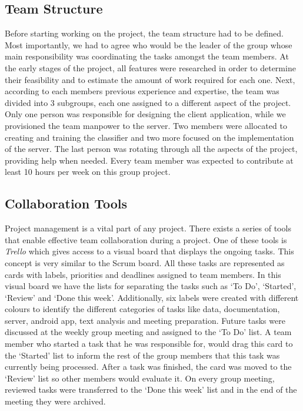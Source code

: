 \subsection{Team Structure} 
Before starting working on the project, the team structure had to be defined. Most importantly, we had to 
agree who would be the leader of the group whose main responsibility was coordinating the tasks amongst the 
team members. At the early stages of the project, all features were researched in order to 
determine their feasibility and to estimate the amount of work required for each one. Next, according to 
each members previous experience and expertise, the team was divided into 3 subgroups, each one assigned to 
a different aspect of the project. Only one person was responsible for designing the client application, while
we provisioned the team manpower to the server. Two members were allocated to creating and training 
the classifier and two more focused on the implementation of the server. The last person was rotating through 
all the aspects of the project, providing help when needed. Every team member was expected to contribute 
at least 10 hours per week on this group project.

\subsection{Collaboration Tools} 
Project management is a vital part of any project. There exists a series of tools that enable effective team 
collaboration during a project. One of these tools is \emph{Trello} which gives access to a visual board 
that displays the ongoing tasks. This concept is very similar to the Scrum board. All these tasks 
are represented as cards with labels, priorities and deadlines assigned to 
team members. In this visual board we have the lists for separating the tasks such as `To Do', `Started', `Review' and `Done this week'. 
Additionally, six labels were created with different colours to identify the
different categories of tasks like data, 
documentation, server, android app, text analysis and meeting preparation. Future tasks were 
discussed at the weekly group meeting and assigned to the `To Do' list. A team
member who started a task that he was responsible for, 
would drag this card to the `Started' list to inform the rest of the group members that this task was currently being processed. 
After a task was finished, the card was moved to the `Review' list so other members would evaluate it. 
On every group meeting, reviewed tasks were transferred to the `Done this week' list and in the end of the meeting they were
archived.

